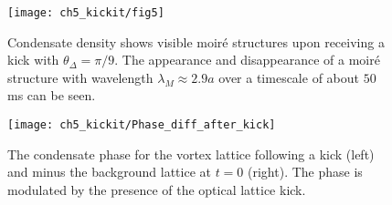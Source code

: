 	\begin{figure}[ht]
        \centering
		\texttt{[image: ch5\_kickit/fig5]}
		\caption[Oscillation of moir\'e wavelength.]{Condensate density shows visible moir\'e structures upon receiving a kick with $\theta_\Delta=\pi/9$. The appearance and disappearance of a moir\'e structure with wavelength $\lambda_M \approx 2.9 a$ over a timescale of about $50$ ms can be seen.}
		\label{fig:dtheta20_ev}
	\end{figure}

    \begin{figure}[ht]
        \centering
		\texttt{[image: ch5\_kickit/Phase\_diff\_after\_kick]}
		\caption[Phase modulation following a kick.]{The condensate phase for the vortex lattice following a kick (left) and minus the background lattice at $t=0$ (right). The phase is modulated by the presence of the optical lattice kick.}
		\label{fig:Phase_diff_after_kick}
	\end{figure}


